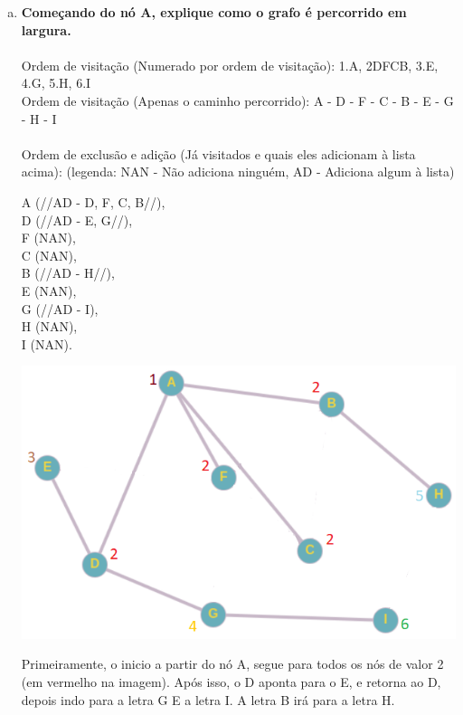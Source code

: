 \documentclass[11pt]{article} %
\begin{document}
\begin{enumerate}[a)]
A imagem acima já mostra o caminho percorrido pelo grafo (via profundidade, indo cada vez mais fundo e por ordem alfabética) indo pelo caminho disponível, dada a forma em que o grafo estava distribuído.

\newpage

\item {\bf Começando do nó A, explique como o grafo é percorrido em largura.} \\ \\


Ordem de visitação (Numerado por ordem de visitação):  1.A, 2{DFCB}, 3.E, 4.G, 5.H,  6.I \\ 
Ordem de visitação (Apenas o caminho percorrido): A - D - F - C - B - E - G - H - I \\ \\
Ordem de exclusão e adição (Já visitados e quais eles adicionam à lista acima): \vspace*{0.1cm}
{\small (legenda: NAN - Não adiciona ninguém, AD - Adiciona algum à lista)}

 A (//AD - D, F, C, B//), \\
 D (//AD - E, G//), \\
 F (NAN), \\
 C (NAN), \\
 B (//AD - H//), \\
 E (NAN), \\
 G (//AD - I), \\
 H (NAN), \\
 I (NAN). \\

		\begin{center}
			\includegraphics[scale = 0.7]{q2c.png}
		\end{center}
Primeiramente, o inicio a partir do nó A, segue para todos os nós de valor 2 (em vermelho na imagem). Após isso, o D aponta para o E, e retorna ao D, depois indo para a letra G E a letra I. A letra B irá para a letra H.


\end{enumerate}
\end{document}

